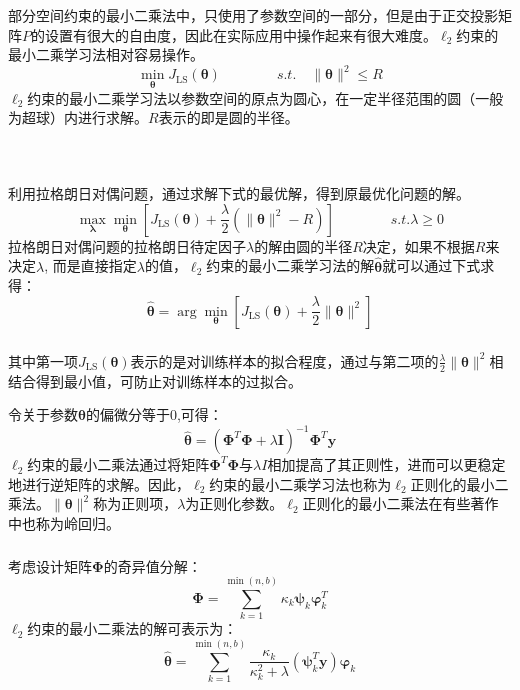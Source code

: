 \documentclass{beamer}
\newcommand{\tmmathbf}[1]{\ensuremath{\boldsymbol{#1}}}
\newcommand{\tmop}[1]{\ensuremath{\operatorname{#1}}}
\begin{document}
\begin{CJK*}{UTF8}{gbsn}
{{\begin{frame}
  部分空间约束的最小二乘法中，只使用了参数空间的一部分，但是由于正交投影矩阵$P$的设置有很大的自由度，因此在实际应用中操作起来有很大难度。$\ell_2$约束的最小二乘学习法相对容易操作。
  \[ \min_{\tmmathbf{\theta}} J_{\tmop{LS}} (\tmmathbf{\theta}) \hspace{4em}
     s.t. \quad \| \tmmathbf{\theta} \|^2 \leqslant R \]
  $\ell_2$约束的最小二乘学习法以参数空间的原点为圆心，在一定半径范围的圆（一般为超球）内进行求解。$R$表示的即是圆的半径。
  
  \ 
\end{frame}}{\begin{frame}
  \frametitle{}
  
  利用拉格朗日对偶问题，通过求解下式的最优解，得到原最优化问题的解。
  \[ \max_{\tmmathbf{\lambda}} \min_{\tmmathbf{\theta}}  \left[ J_{\tmop{LS}}
     (\tmmathbf{\theta}) + \frac{\lambda}{2} (\| \tmmathbf{\theta} \|^2 - R)
     \right] \hspace{4em} s.t. \lambda \geqslant 0 \]
  拉格朗日对偶问题的拉格朗日待定因子$\lambda$的解由圆的半径$R$决定，如果不根据$R$来决定$\lambda$,
  而是直接指定$\lambda$的值，$\ell_2$约束的最小二乘学习法的解$\hat{\tmmathbf{\theta}}$就可以通过下式求得：
  \[ \hat{\tmmathbf{\theta}} = \arg \min_{\tmmathbf{\theta}} \left[
     J_{\tmop{LS}} (\tmmathbf{\theta}) + \frac{\lambda}{2} \|
     \tmmathbf{\theta} \|^2 \right] \]
  
\end{frame}}{\begin{frame}
  \frametitle{}
  
  其中第一项$J_{\tmop{LS}}
  (\tmmathbf{\theta})$表示的是对训练样本的拟合程度，通过与第二项的$\frac{\lambda}{2}
  \| \tmmathbf{\theta}
  \|^2$相结合得到最小值，可防止对训练样本的过拟合。
  
  令关于参数$\tmmathbf{\theta}$的偏微分等于0,可得：
  \[ \hat{\tmmathbf{\theta}} = (\tmmathbf{\Phi}^T \tmmathbf{\Phi}+ \lambda
     \tmmathbf{I})^{- 1} \tmmathbf{\Phi}^T \tmmathbf{y} \]
  $\ell_2$约束的最小二乘法通过将矩阵$\tmmathbf{\Phi}^T
  \tmmathbf{\Phi}$与$\lambda
  I$相加提高了其正则性，进而可以更稳定地进行逆矩阵的求解。因此，$\ell_2$约束的最小二乘学习法也称为$\ell_2$正则化的最小二乘法。$\|
  \tmmathbf{\theta}
  \|^2$称为正则项，$\lambda$为正则化参数。$\ell_2$正则化的最小二乘法在有些著作中也称为岭回归。
\end{frame}}{\begin{frame}
  \frametitle{}
  
  考虑设计矩阵$\tmmathbf{\Phi}$的奇异值分解：
  \[ \tmmathbf{\Phi}= \sum_{k = 1}^{\min (n, b)} \kappa_k \tmmathbf{\psi}_k
     \tmmathbf{\varphi}_k^T \]
  $\ell_2$约束的最小二乘法的解可表示为：
  \[ \hat{\tmmathbf{\theta}} = \sum_{k = 1}^{\min (n, b)}
     \frac{\kappa_k}{\kappa_k^2 + \lambda} (\tmmathbf{\psi}_k^T \tmmathbf{y})
     \tmmathbf{\varphi}_k \]
\end{frame}}{\frametitle{}

}}
\end{CJK*}
\end{document}
